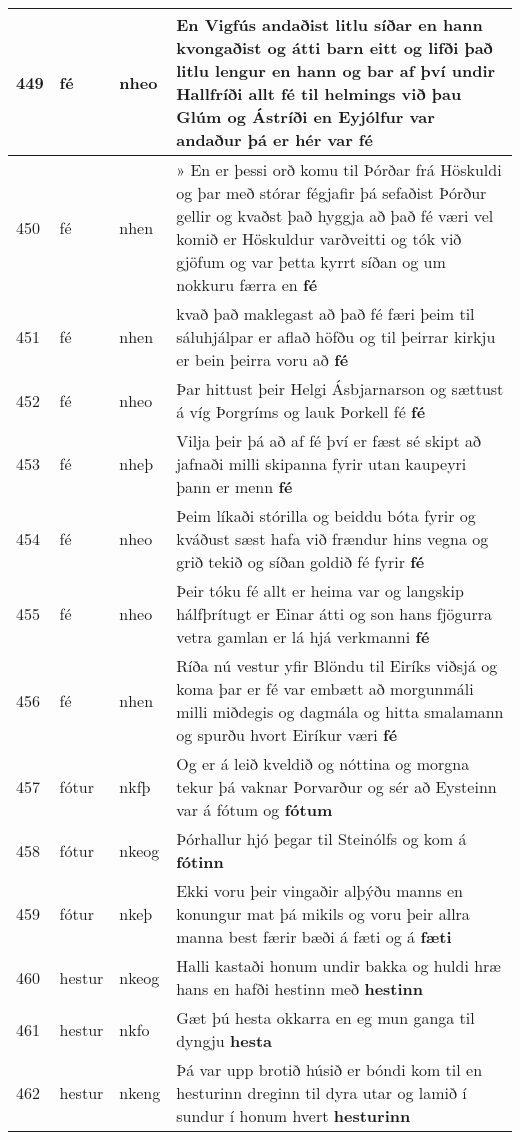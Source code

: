 \documentclass{article}
\begin{document}
\begin{longtable}{p{1cm}|p{1cm}|p{1cm}|p{13cm}}
\hline
449&fé&nheo&En Vigfús andaðist litlu síðar en hann kvongaðist og átti barn eitt og lifði það litlu lengur en hann og bar af því undir Hallfríði allt fé til helmings við þau Glúm og Ástríði en Eyjólfur var andaður þá er hér var \textbf{fé} \\
\hline
450&fé&nhen&» En er þessi orð komu til Þórðar frá Höskuldi og þar með stórar fégjafir þá sefaðist Þórður gellir og kvaðst það hyggja að það fé væri vel komið er Höskuldur varðveitti og tók við gjöfum og var þetta kyrrt síðan og um nokkuru færra en \textbf{fé} \\
\hline
451&fé&nhen&kvað það maklegast að það fé færi þeim til sáluhjálpar er aflað höfðu og til þeirrar kirkju er bein þeirra voru að \textbf{fé} \\
\hline
452&fé&nheo&Þar hittust þeir Helgi Ásbjarnarson og sættust á víg Þorgríms og lauk Þorkell fé \textbf{fé} \\
\hline
453&fé&nheþ&Vilja þeir þá að af fé því er fæst sé skipt að jafnaði milli skipanna fyrir utan kaupeyri þann er menn \textbf{fé} \\
\hline
454&fé&nheo&Þeim líkaði stórilla og beiddu bóta fyrir og kváðust sæst hafa við frændur hins vegna og grið tekið og síðan goldið fé fyrir \textbf{fé} \\
\hline
455&fé&nheo&Þeir tóku fé allt er heima var og langskip hálfþrítugt er Einar átti og son hans fjögurra vetra gamlan er lá hjá verkmanni \textbf{fé} \\
\hline
456&fé&nhen&Ríða nú vestur yfir Blöndu til Eiríks viðsjá og koma þar er fé var embætt að morgunmáli milli miðdegis og dagmála og hitta smalamann og spurðu hvort Eiríkur væri \textbf{fé} \\
\hline
457&fótur&nkfþ&Og er á leið kveldið og nóttina og morgna tekur þá vaknar Þorvarður og sér að Eysteinn var á fótum og \textbf{fótum} \\
\hline
458&fótur&nkeog&Þórhallur hjó þegar til Steinólfs og kom á \textbf{fótinn} \\
\hline
459&fótur&nkeþ&Ekki voru þeir vingaðir alþýðu manns en konungur mat þá mikils og voru þeir allra manna best færir bæði á fæti og á \textbf{fæti} \\
\hline
460&hestur&nkeog&Halli kastaði honum undir bakka og huldi hræ hans en hafði hestinn með \textbf{hestinn} \\
\hline
461&hestur&nkfo&Gæt þú hesta okkarra en eg mun ganga til dyngju \textbf{hesta} \\
\hline
462&hestur&nkeng&Þá var upp brotið húsið er bóndi kom til en hesturinn dreginn til dyra utar og lamið í sundur í honum hvert \textbf{hesturinn} \\

\end{longtable}
\end{document}
